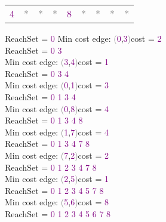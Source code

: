 \begin{tcolorbox}
{\begin{tabular}{*{9}{c}}
        \textcolor{Purple}{4} & \textcolor{Gray}{*} & \textcolor{Gray}{*} & \textcolor{Gray}{*} & \textcolor{Purple}{8} & \textcolor{Gray}{*} & \textcolor{Gray}{*} & \textcolor{Gray}{*} & \textcolor{Gray}{*} \\
        
    \end{tabular}
    
    \vspace{\baselineskip}
    
    ReachSet = \textcolor{Purple}{0} Min cost edge: \textcolor{Gray}{(}\textcolor{Purple}{0},\textcolor{Purple}{3}\textcolor{Gray}{)}cost = \textcolor{Purple}{2} \\
    ReachSet = \textcolor{Purple}{0 3} \\
    Min cost edge: \textcolor{Gray}{(}\textcolor{Purple}{3},\textcolor{Purple}{4}\textcolor{Gray}{)}cost = \textcolor{Purple}{1} \\
    ReachSet = \textcolor{Purple}{0 3 4} \\
    Min cost edge: \textcolor{Gray}{(}\textcolor{Purple}{0},\textcolor{Purple}{1}\textcolor{Gray}{)}cost = \textcolor{Purple}{3} \\
    ReachSet = \textcolor{Purple}{0 1 3 4} \\
    Min cost edge: \textcolor{Gray}{(}\textcolor{Purple}{0},\textcolor{Purple}{8}\textcolor{Gray}{)}cost = \textcolor{Purple}{4} \\
    ReachSet = \textcolor{Purple}{0 1 3 4 8} \\
    Min cost edge: \textcolor{Gray}{(}\textcolor{Purple}{1},\textcolor{Purple}{7}\textcolor{Gray}{)}cost = \textcolor{Purple}{4} \\
    ReachSet = \textcolor{Purple}{0 1 3 4 7 8} \\
    Min cost edge: \textcolor{Gray}{(}\textcolor{Purple}{7},\textcolor{Purple}{2}\textcolor{Gray}{)}cost = \textcolor{Purple}{2} \\
    ReachSet = \textcolor{Purple}{0 1 2 3 4 7 8} \\
    Min cost edge: \textcolor{Gray}{(}\textcolor{Purple}{2},\textcolor{Purple}{5}\textcolor{Gray}{)}cost = \textcolor{Purple}{1} \\
    ReachSet = \textcolor{Purple}{0 1 2 3 4 5 7 8} \\
    Min cost edge: \textcolor{Gray}{(}\textcolor{Purple}{5},\textcolor{Purple}{6}\textcolor{Gray}{)}cost = \textcolor{Purple}{8} \\
    ReachSet = \textcolor{Purple}{0 1 2 3 4 5 6 7 8} \\
}
\end{tcolorbox}
